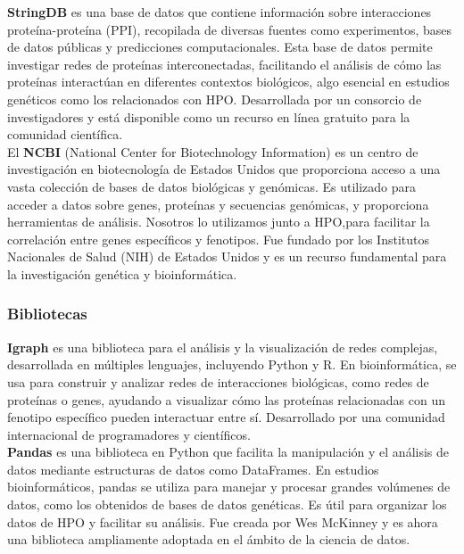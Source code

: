 \textbf{StringDB} es una base de datos que contiene información sobre interacciones proteína-proteína (PPI), recopilada de diversas fuentes como experimentos, bases de datos públicas y predicciones computacionales.
Esta base de datos permite investigar redes de proteínas interconectadas, facilitando el análisis de cómo las proteínas interactúan en diferentes contextos biológicos, algo esencial en estudios genéticos como los relacionados con HPO.
Desarrollada por un consorcio de investigadores y está disponible como un recurso en línea gratuito para la comunidad científica.\cite{szklarczyk2015string}\\

 

El \textbf{NCBI} (National Center for Biotechnology Information) es un centro de investigación en biotecnología de Estados Unidos que proporciona acceso a una vasta colección de bases de datos biológicas y genómicas.
Es utilizado para acceder a datos sobre genes, proteínas y secuencias genómicas, y proporciona herramientas de análisis. Nosotros lo utilizamos junto a HPO,para facilitar la correlación entre genes específicos y fenotipos.
Fue fundado por los Institutos Nacionales de Salud (NIH) de Estados Unidos y es un recurso fundamental para la investigación genética y bioinformática.\cite{jenuth1999ncbi}



\subsubsection{Bibliotecas}




\textbf{Igraph} es una biblioteca para el análisis y la visualización de redes complejas, desarrollada en múltiples lenguajes, incluyendo Python y R.
En bioinformática, se usa para construir y analizar redes de interacciones biológicas, como redes de proteínas o genes, ayudando a visualizar cómo las proteínas relacionadas con un fenotipo específico pueden interactuar entre sí.
Desarrollado por una comunidad internacional de programadores y científicos.\cite{valdez2016analisis}\\


\textbf{Pandas} es una biblioteca en Python que facilita la manipulación y el análisis de datos mediante estructuras de datos como DataFrames.
En estudios bioinformáticos, pandas se utiliza para manejar y procesar grandes volúmenes de datos, como los obtenidos de bases de datos genéticas. Es útil para organizar los datos de HPO y facilitar su análisis.
Fue creada por Wes McKinney y es ahora una biblioteca ampliamente adoptada en el ámbito de la ciencia de datos.\cite{mckinney2011pandas}\\


